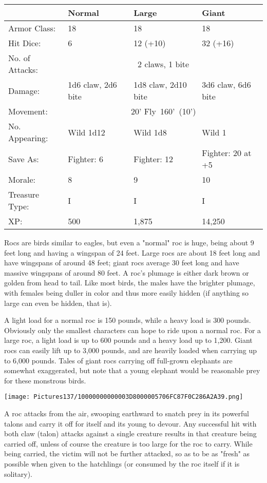 \documentclass[a4paper,twoside,openany,10pt]{book}
\begin{document}
\begin{multicols}{2}
\begin{tabularx}{0.50\textwidth}{@{}lXXX@{}}
& Normal & Large & Giant \\\hline
Armor Class: & 18 & 18 & 18 \\\hline
Hit Dice: & 6 & 12 (+10) & 32 (+16) \\\hline
No. of Attacks: &\multicolumn{3}{c}{2 claws, 1 bite} \\\hline
Damage: & 1d6 claw, 2d6 bite & 1d8 claw, 2d10 bite & 3d6 claw, 6d6 bite \\\hline
Movement: & \multicolumn{3}{c}{20' Fly~160'~(10')} \\\hline
No. Appearing: & Wild 1d12 & Wild 1d8 & Wild 1 \\\hline
Save As: & Fighter: 6 & Fighter: 12 & Fighter: 20 at +5 \\\hline
Morale: & 8 & 9 & 10 \\\hline
Treasure Type: & I & I & I \\\hline
XP: & 500 & 1,875 & 14,250 \\\hline
\end{tabularx}\medskip

Rocs are birds similar to eagles, but even a "normal" roc is huge, being about 9 feet long and having a wingspan of 24 feet. Large rocs are about 18 feet long and have wingspans of around 48 feet; giant rocs average 30 feet long and have massive wingspans of around 80 feet. A roc's plumage is either dark brown or golden from head to tail. Like most birds, the males have the brighter plumage, with females being duller in color and thus more easily hidden (if anything so large can even be hidden, that is).

A light load for a normal roc is 150 pounds, while a heavy load is 300 pounds. Obviously only the smallest characters can hope to ride upon a normal roc. For a large roc, a light load is up to 600 pounds and a heavy load up to 1,200.  Giant rocs can easily lift up to 3,000 pounds, and are heavily loaded when carrying up to 6,000 pounds. Tales of giant rocs carrying off full-grown elephants are somewhat exaggerated, but note that a young elephant would be reasonable prey for these monstrous birds. 


\begin{center} \texttt{[image: Pictures137/10000000000003D8000005706FC87F0C286A2A39.png]} \end{center}

A roc attacks from the air, swooping earthward to snatch prey in its powerful talons and carry it off for itself and its young to devour. Any successful hit with both claw (talon) attacks against a single creature results in that creature being carried off, unless of course the creature is too large for the roc to carry. While being carried, the victim will not be further attacked, so as to be as "fresh" as possible when given to the hatchlings (or consumed by the roc itself if it is solitary).


\end{multicols}
\end{document}
